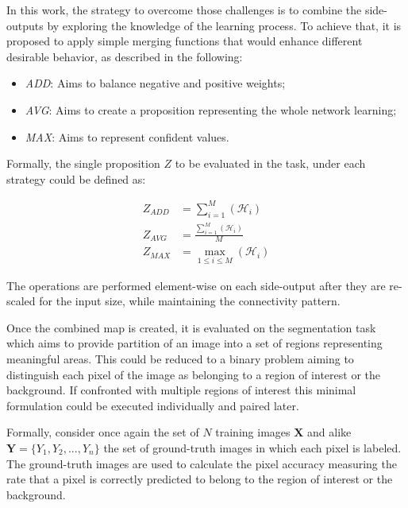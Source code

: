 
In this work, the strategy to overcome those challenges is to combine the side-outputs by exploring the knowledge of the learning process. To achieve that, it is proposed to apply simple merging functions that would enhance different desirable behavior, as described in the following: 
\begin{itemize}
\item \textit{ADD}: Aims to balance negative and positive weights;
\item \textit{AVG}: Aims to create a proposition representing the whole network learning;  
\item \textit{MAX}: Aims to represent confident values. 
\end{itemize}  

Formally, the single proposition $Z$ to be evaluated in the task, under each strategy could be defined as:

\begin{align}
Z_{ADD} &= \sum_{i=1}^{M}(\mathcal{H}_i)\\
Z_{AVG} &= \frac{\sum_{i=1}^{M}(\mathcal{H}_i)}{M}\\
Z_{MAX} &= \max_{1 \leq i \leq M} (\mathcal{H}_i)
\end{align} 

The operations are performed element-wise on each side-output after they are re-scaled for the input size, while maintaining the connectivity pattern. 

Once the combined map is created, it is evaluated on the segmentation task which aims to provide partition of an image into a set of regions representing meaningful areas. This could be reduced to a binary problem aiming to distinguish each pixel of the image as belonging to a region of interest or the background. If confronted with multiple regions of interest this minimal formulation could be executed individually and paired later.

Formally, consider once again the set of $N$ training images $\mathbf{X}$ and alike $\mathbf{Y}=\{Y_1, Y_2,...,Y_n\}$ the set of ground-truth images in which each pixel is labeled.  The ground-truth images are used to calculate the pixel accuracy measuring the rate that a pixel is correctly predicted to belong to the region of interest or the background.

